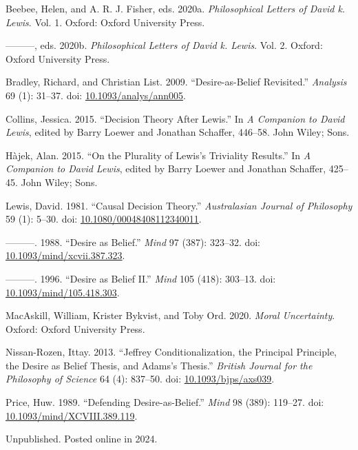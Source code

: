 \documentclass[
  10pt,
  letterpaper,
  DIV=11,
  numbers=noendperiod,
  twoside]{scrartcl}
\newlength{\cslhangindent}
\newenvironment{CSLReferences}[2] %
 {\begin{list}{}{%
  \setlength{\itemindent}{0pt}
  \setlength{\leftmargin}{0pt}
  \setlength{\parsep}{0pt}
  \ifodd #1
   \setlength{\leftmargin}{\cslhangindent}
   \setlength{\itemindent}{-1\cslhangindent}
  \fi
  \setlength{\itemsep}{#2\baselineskip}}}
 {\end{list}}
\begin{document}
\label{refs}
\begin{CSLReferences}{1}{0}
Beebee, Helen, and A. R. J. Fisher, eds. 2020a. \emph{Philosophical
Letters of David k. Lewis}. Vol. 1. Oxford: Oxford University Press.

---------, eds. 2020b. \emph{Philosophical Letters of David k. Lewis}.
Vol. 2. Oxford: Oxford University Press.

Bradley, Richard, and Christian List. 2009. {``Desire-as-Belief
Revisited.''} \emph{Analysis} 69 (1): 31--37. doi:
\href{https://doi.org/10.1093/analys/ann005}{10.1093/analys/ann005}.

Collins, Jessica. 2015. {``Decision Theory After Lewis.''} In \emph{A
Companion to David Lewis}, edited by Barry Loewer and Jonathan Schaffer,
446--58. John Wiley; Sons.

Hàjek, Alan. 2015. {``On the Plurality of Lewis's Triviality Results.''}
In \emph{A Companion to David Lewis}, edited by Barry Loewer and
Jonathan Schaffer, 425--45. John Wiley; Sons.

Lewis, David. 1981. {``Causal Decision Theory.''} \emph{Australasian
Journal of Philosophy} 59 (1): 5--30. doi:
\href{https://doi.org/10.1080/00048408112340011}{10.1080/00048408112340011}.

---------. 1988. {``Desire as Belief.''} \emph{Mind} 97 (387): 323--32.
doi:
\href{https://doi.org/10.1093/mind/xcvii.387.323}{10.1093/mind/xcvii.387.323}.

---------. 1996. {``Desire as Belief {II}.''} \emph{Mind} 105 (418):
303--13. doi:
\href{https://doi.org/10.1093/mind/105.418.303}{10.1093/mind/105.418.303}.

MacAskill, William, Krister Bykvist, and Toby Ord. 2020. \emph{Moral
Uncertainty}. Oxford: {O}xford {U}niversity {P}ress.

Nissan-Rozen, Ittay. 2013. {``Jeffrey Conditionalization, the Principal
Principle, the Desire as Belief Thesis, and Adams's Thesis.''}
\emph{British Journal for the Philosophy of Science} 64 (4): 837--50.
doi: \href{https://doi.org/10.1093/bjps/axs039}{10.1093/bjps/axs039}.

Price, Huw. 1989. {``Defending Desire-as-Belief.''} \emph{Mind} 98
(389): 119--27. doi:
\href{https://doi.org/10.1093/mind/XCVIII.389.119}{10.1093/mind/XCVIII.389.119}.

\end{CSLReferences}



\noindent Unpublished. Posted online in 2024.
\end{document}

